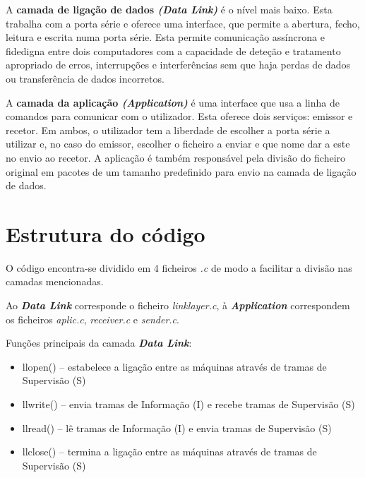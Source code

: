 \documentclass[a4paper,11pt,portuguese]{article}
\begin{document}
    A \textbf{camada de ligação de dados \textit{(Data Link)}} é o nível mais baixo. Esta trabalha
    com a porta série e oferece uma interface, que permite a abertura, fecho, leitura e escrita
    numa porta série. Esta permite comunicação assíncrona e fidedigna entre dois
    computadores com a capacidade de deteção e tratamento apropriado de erros, interrupções 
    e interferências sem que haja perdas de dados ou transferência de dados incorretos. \par 

    A \textbf{camada da aplicação \textit{(Application)}} é uma interface que usa a linha de
    comandos para comunicar com o utilizador. Esta oferece dois serviços: emissor e recetor.
    Em ambos, o utilizador tem a liberdade de escolher a porta série a utilizar e, no caso do emissor, 
    escolher o ficheiro a enviar e que nome dar a este no envio ao recetor. A aplicação é também
    responsável pela divisão do ficheiro original em pacotes de um tamanho predefinido para
    envio na camada de ligação de dados. \par 


\section{Estrutura do código}

    O código encontra-se dividido em 4 ficheiros \textit{.c} de modo a facilitar a divisão
    nas camadas mencionadas. \par
    
    Ao \textbf{\textit{Data Link}} corresponde o ficheiro \textit{linklayer.c}, à
    \textbf{\textit{Application}} correspondem os ficheiros \textit{aplic.c},
    \textit{receiver.c} e \textit{sender.c}.
    
    \hfill \break
    \noindent Funções principais da camada \textbf{\textit{Data Link}}:
    \begin{itemize}
        \item llopen() -- estabelece a ligação entre as máquinas através de tramas de Supervisão (S)
        \item llwrite() -- envia tramas de Informação (I) e recebe tramas de Supervisão (S)
        \item llread() -- lê tramas de Informação (I) e envia tramas de Supervisão (S)
        \item llclose() -- termina a ligação entre as máquinas através de tramas de Supervisão (S)
    \end{itemize}
\end{document}
